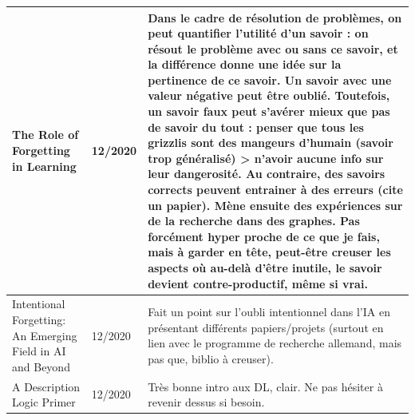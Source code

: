 \documentclass[french]{article}
\begin{document}
    \begin{table}[ht!]
        \begin{center}
        \begin{tabular}{|p{}|p{}|p{}|}
            \hline
            The  Role  of  Forgetting  in  Learning \cite{marcot_advances_2019}
            & 12/2020
            & Dans le cadre de résolution de problèmes, on peut quantifier l'utilité d'un savoir : on résout le problème avec ou sans ce savoir, et la différence donne une idée sur la pertinence de ce savoir. Un savoir avec une valeur négative peut être oublié.
            Toutefois, un savoir faux peut s'avérer mieux que pas de savoir du tout : penser que tous les grizzlis sont des mangeurs d'humain (savoir trop généralisé) > n'avoir aucune info sur leur dangerosité. Au contraire, des savoirs corrects peuvent entrainer à des erreurs (cite un papier). Mène ensuite des expériences sur de la recherche dans des graphes. Pas forcément hyper proche de ce que je fais, mais à garder en tête, peut-être creuser les aspects où au-delà d'être inutile, le savoir devient contre-productif, même si vrai. \\
            \hline

            Intentional Forgetting: An Emerging Field in AI and Beyond \cite{beierle_intentional_2019}
            & 12/2020
            & Fait un point sur l'oubli intentionnel dans l'IA en présentant différents papiers/projets (surtout en lien avec le programme de recherche allemand, mais pas que, biblio à creuser).\\
            \hline
            

            A Description Logic Primer \cite{krotzsch_description_2013}
            & 12/2020
            & Très bonne intro aux DL, clair. Ne pas hésiter à revenir dessus si besoin.
            \\
            \hline


\end{tabular}
\end{center}
\end{table}
\end{document}
